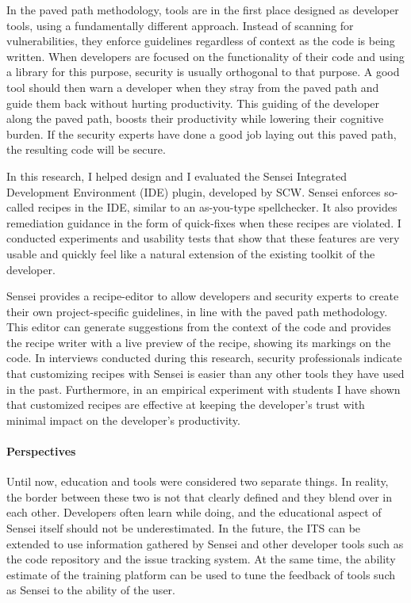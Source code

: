 In the paved path methodology, tools are in the first place designed as developer tools, using a fundamentally different approach.
Instead of scanning for vulnerabilities, they enforce guidelines regardless of context as the code is being written.
When developers are focused on the functionality of their code and using a library for this purpose, security is usually orthogonal to that purpose.
A good tool should then warn a developer when they stray from the paved path and guide them back without hurting productivity.
This guiding of the developer along the paved path, boosts their productivity while lowering their cognitive burden.
If the security experts have done a good job laying out this paved path, the resulting code will be secure.

In this research, I helped design and I evaluated the Sensei Integrated Development Environment (IDE) plugin, developed by SCW.
Sensei enforces so-called recipes in the IDE, similar to an as-you-type spellchecker.
It also provides remediation guidance in the form of quick-fixes when these recipes are violated.
I conducted experiments and usability tests that show that these features are very usable and quickly feel like a natural extension of the existing toolkit of the developer.

Sensei provides a recipe-editor to allow developers and security experts to create their own project-specific guidelines, in line with the paved path methodology.
This editor can generate suggestions from the context of the code and provides the recipe writer with a live preview of the recipe, showing its markings on the code.
In interviews conducted during this research, security professionals indicate that customizing recipes with Sensei is easier than any other tools they have used in the past.
Furthermore, in an empirical experiment with students I have shown that customized recipes are effective at keeping the developer's trust with minimal impact on the developer's productivity.

\paragraph{Perspectives}
Until now, education and tools were considered two separate things.
In reality, the border between these two is not that clearly defined and they blend over in each other.
Developers often learn while doing, and the educational aspect of Sensei itself should not be underestimated.
In the future, the ITS can be extended to use information gathered by Sensei and other developer tools such as the code repository and the issue tracking system.
At the same time, the ability estimate of the training platform can be used to tune the feedback of tools such as Sensei to the ability of the user.